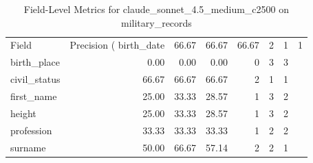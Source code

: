 \begin{table}
\caption{Field-Level Metrics for claude_sonnet_4.5_medium_c2500 on military_records}
\label{tab:fields_claude_sonnet_4.5_medium_c2500_military_records}
\begin{tabular}{lrrrrrr}
\toprule
Field & Precision (%
\midrule
birth_date & 66.67 & 66.67 & 66.67 & 2 & 1 & 1 \\
birth_place & 0.00 & 0.00 & 0.00 & 0 & 3 & 3 \\
civil_status & 66.67 & 66.67 & 66.67 & 2 & 1 & 1 \\
first_name & 25.00 & 33.33 & 28.57 & 1 & 3 & 2 \\
height & 25.00 & 33.33 & 28.57 & 1 & 3 & 2 \\
profession & 33.33 & 33.33 & 33.33 & 1 & 2 & 2 \\
surname & 50.00 & 66.67 & 57.14 & 2 & 2 & 1 \\
\bottomrule
\end{tabular}
\end{table}

